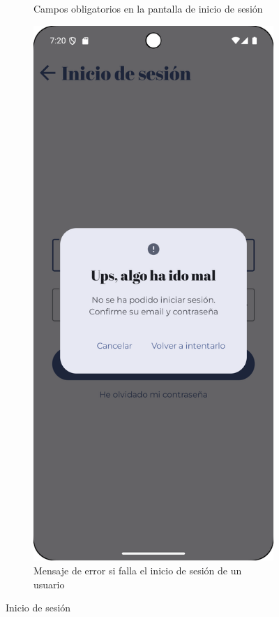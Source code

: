\begin{figure}[H]
\begin{subfigure}[b]{0.3\textwidth}
      \caption{Campos obligatorios en la pantalla de inicio de sesión}
      \label{fig:login-must}
    \end{subfigure}
    \hfill
    \begin{subfigure}[b]{0.3\textwidth}
      \includegraphics[width=\textwidth]{./img/manual/pinche_login_error.png}
      \caption{Mensaje de error si falla el inicio de sesión de un usuario}
      \label{fig:login-error}
    \end{subfigure}

    \caption{Inicio de sesión}
    \label{fig:login}
\end{figure}

